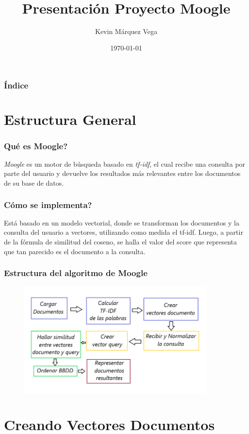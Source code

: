 \documentclass{beamer}
\title{Presentación Proyecto Moogle}
\author{Kevin Márquez Vega}
\institute{Universidad de La Habana}
\date{\today}
\begin{document}
\lstset{style = myCSharp}

\frame{\titlepage}

\begin{frame}
    \frametitle{Índice}
    \tableofcontents
\end{frame}

\section{Estructura General}

\begin{frame}
    \frametitle{Qué es Moogle?}
    \textit{Moogle} es un motor de búsqueda basado en \textit{tf-idf}, el cual recibe una consulta por parte del usuario 
    y devuelve los resultados más relevantes entre los documentos de su base de datos.
\end{frame}

\begin{frame}
    \frametitle{Cómo se implementa?}
    Está basado en un modelo vectorial, donde se transforman los documentos y la consulta del usuario a vectores, utilizando
    como medida el tf-idf. Luego, a partir de la fórmula de similitud del coseno, se halla el valor del score que representa
    que tan parecido es el documento a la consulta.
\end{frame}


\begin{frame}
    \frametitle{Estructura del algoritmo de Moogle}
    \begin{figure}
        \includegraphics[width = 10cm]{./../images/struct.png}
    \end{figure}
\end{frame}

\section{Creando Vectores Documentos}
\end{document}
